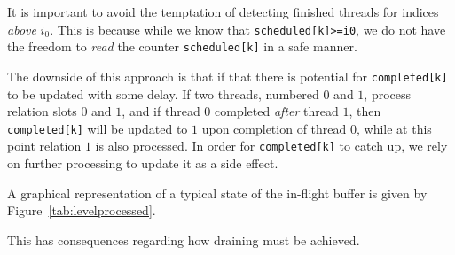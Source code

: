 \documentclass[10pt]{article}
\begin{document}
It is important to avoid the temptation of detecting finished threads for
indices \emph{above} $i_0$. This is because while we know that
\verb|scheduled[k]>=i0|, we do not have the freedom to \emph{read} the
counter \verb|scheduled[k]| in a safe manner.


The downside of this approach is that if that there is potential for
\verb|completed[k]| to be updated with some delay. If two threads,
numbered $0$ and $1$, process relation slots $0$ and $1$, and if thread
$0$ completed \emph{after} thread $1$, then \verb|completed[k]| will be
updated to $1$ upon completion of thread $0$, while at this point
relation $1$ is also processed. In order for \verb|completed[k]| to catch
up, we rely on further processing to update it as a side effect.

A graphical representation of a typical state of the in-flight buffer
is given by Figure~\ref{tab:levelprocessed}.


This has consequences regarding how draining must be achieved.
\end{document}
